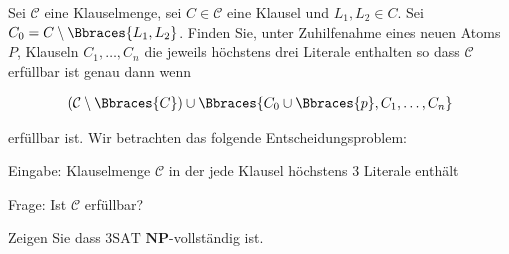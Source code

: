 
\begin{exercise}

Sei $\mathcal C$ eine Klauselmenge, sei $C \in \mathcal C$ eine Klausel und $L_1, L_2 \in C$.
Sei $C_0 = C \setminus \Bbraces{L_1, L_2}$.
Finden Sie, unter Zuhilfenahme eines neuen Atoms $P$, Klauseln $C_1, \dots, C_n$ die jeweils höchstens drei Literale enthalten so dass $\mathcal C$ erfüllbar ist genau dann wenn

\begin{align*}
    (\mathcal C \setminus \Bbraces{C})
    \cup
    \Bbraces{C_0 \cup \Bbraces{p}, C_1, \dots, C_n}
\end{align*}

erfüllbar ist.
Wir betrachten das folgende Entscheidungsproblem:

\begin{center}
    \begin{hetzlbox}[title = 3SAT]
        
        Eingabe:
        Klauselmenge $\mathcal C$ in der jede Klausel höchstens $3$ Literale enthält
    
        Frage:
        Ist $\mathcal C$ erfüllbar?
    
    \end{hetzlbox}    
\end{center}

Zeigen Sie dass $\mathrm{3SAT}$ $\mathbf{NP}$-vollständig ist.

\end{exercise}


\begin{solution}

\phantom{}

\end{solution}

